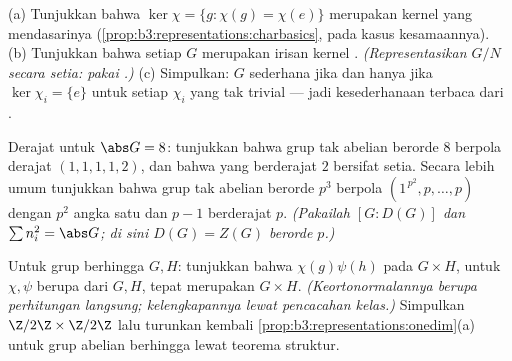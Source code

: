 \begin{exercise}[$\star\star$]\label{exo:b3:representations:6}
(a) Tunjukkan bahwa $\ker\chi = \{g : \chi(g) = \chi(e)\}$ merupakan
kernel  yang mendasarinya
(\cref{prop:b3:representations:charbasics}, pada kasus kesamaannya).
(b) Tunjukkan bahwa setiap  $G$ merupakan irisan
kernel  . \emph{(Representasikan $G/N$
secara setia: pakai .)}
(c) Simpulkan: $G$ sederhana jika dan hanya jika $\ker\chi_i = \{e\}$ untuk setiap
$\chi_i$  yang tak trivial --- jadi kesederhanaan terbaca dari
.
\end{exercise}

\begin{exercise}[$\star\star$]\label{exo:b3:representations:7}
Derajat untuk $\abs G = 8$: tunjukkan bahwa grup tak abelian berorde
$8$ berpola derajat $(1,1,1,1,2)$, dan bahwa  yang
berderajat $2$ bersifat setia. Secara lebih umum tunjukkan bahwa grup
tak abelian berorde $p^3$ berpola $(1^{\,p^2},
p, \dots, p)$ dengan $p^2$ angka satu dan $p - 1$  berderajat
$p$. \emph{(Pakailah $[G : D(G)]$ dan $\sum n_i^2 = \abs G$; di sini
$D(G) = Z(G)$ berorde $p$.)}
\end{exercise}

\begin{exercise}[$\star\star\star$]\label{exo:b3:representations:8}
Untuk grup berhingga $G, H$: tunjukkan bahwa 
$\chi(g)\psi(h)$ pada $G \times H$, untuk $\chi, \psi$ berupa 
 dari $G, H$, tepat merupakan  
$G \times H$. \emph{(Keortonormalannya berupa perhitungan langsung;
kelengkapannya lewat pencacahan kelas.)} Simpulkan 
$\Z/2\Z \times \Z/2\Z$ lalu turunkan kembali
\cref{prop:b3:representations:onedim}(a) untuk grup abelian
berhingga lewat teorema struktur.
\end{exercise}

